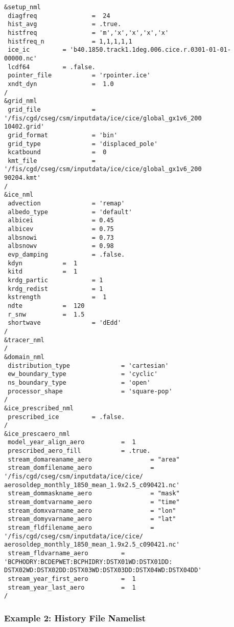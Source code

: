 \begin{verbatim}
&setup_nml
 diagfreq               =  24   
 hist_avg               = .true.  
 histfreq               = 'm','x','x','x','x'
 histfreq_n             = 1,1,1,1,1           
 ice_ic         = 'b40.1850.track1.1deg.006.cice.r.0301-01-01-00000.nc'
 lcdf64         = .false. 
 pointer_file           = 'rpointer.ice'
 xndt_dyn               =  1.0 
/
&grid_nml
 grid_file              = '/fis/cgd/cseg/csm/inputdata/ice/cice/global_gx1v6_200
10402.grid'
 grid_format            = 'bin'
 grid_type              = 'displaced_pole'
 kcatbound              =  0 
 kmt_file               = '/fis/cgd/cseg/csm/inputdata/ice/cice/global_gx1v6_200
90204.kmt'
/
&ice_nml
 advection              = 'remap'
 albedo_type            = 'default'
 albicei                = 0.45
 albicev                = 0.75
 albsnowi               = 0.73
 albsnowv               = 0.98
 evp_damping            = .false.
 kdyn           =  1 
 kitd           =  1 
 krdg_partic            = 1
 krdg_redist            = 1
 kstrength              =  1 
 ndte           =  120 
 r_snw          =  1.5 
 shortwave              = 'dEdd'
/
&tracer_nml
/
&domain_nml
 distribution_type              = 'cartesian'
 ew_boundary_type               = 'cyclic'
 ns_boundary_type               = 'open'
 processor_shape                = 'square-pop'
/
&ice_prescribed_nml
 prescribed_ice         = .false.
/
&ice_prescaero_nml
 model_year_align_aero          =  1  
 prescribed_aero_fill           = .true. 
 stream_domareaname_aero                = "area"
 stream_domfilename_aero                = '/fis/cgd/cseg/csm/inputdata/ice/cice/
aerosoldep_monthly_1850_mean_1.9x2.5_c090421.nc'
 stream_dommaskname_aero                = "mask"
 stream_domtvarname_aero                = "time"
 stream_domxvarname_aero                = "lon"
 stream_domyvarname_aero                = "lat"
 stream_fldfilename_aero                = '/fis/cgd/cseg/csm/inputdata/ice/cice/
aerosoldep_monthly_1850_mean_1.9x2.5_c090421.nc'
 stream_fldvarname_aero         = 'BCPHODRY:BCDEPWET:BCPHIDRY:DSTX01WD:DSTX01DD:
DSTX02WD:DSTX02DD:DSTX03WD:DSTX03DD:DSTX04WD:DSTX04DD'
 stream_year_first_aero         =  1  
 stream_year_last_aero          =  1  
/
\end{verbatim}

\subsubsection {Example 2: History File Namelist}
\label{example2_nml}

